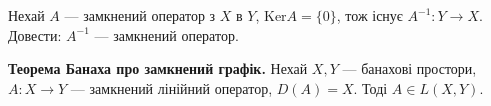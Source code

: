 \begin{exercise}
    Нехай $A$ --- замкнений оператор з $X$ в $Y$, $\mathrm{Ker} A = \{ 0\}$,
    тож існує $A^{-1} : Y \to X$. Довести: $A^{-1}$ --- замкнений оператор.
\end{exercise}

\begin{theory}
    \textbf{Теорема Банаха про замкнений графік.}
    Нехай $X, Y$ --- банахові простори, $A : X \to Y$ --- замкнений лінійний оператор, $D(A) = X$.
    Тоді $A \in L(X, Y)$. 
\end{theory}